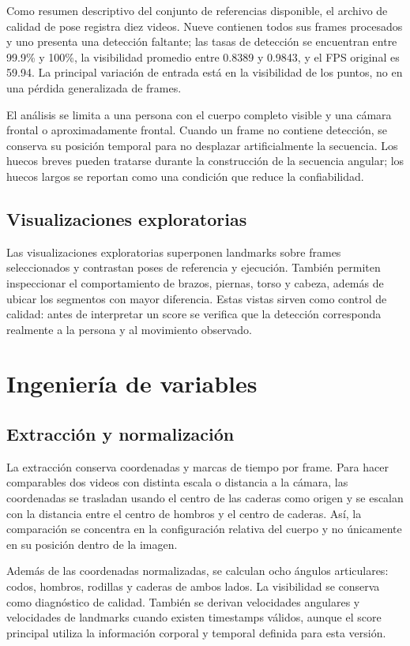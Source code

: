 \documentclass[12pt,a4paper]{article}
\begin{document}
Como resumen descriptivo del conjunto de referencias disponible, el archivo de calidad de pose registra diez videos. Nueve contienen todos sus frames procesados y uno presenta una detección faltante; las tasas de detección se encuentran entre 99.9\% y 100\%, la visibilidad promedio entre 0.8389 y 0.9843, y el FPS original es 59.94. La principal variación de entrada está en la visibilidad de los puntos, no en una pérdida generalizada de frames.

El análisis se limita a una persona con el cuerpo completo visible y una cámara frontal o aproximadamente frontal. Cuando un frame no contiene detección, se conserva su posición temporal para no desplazar artificialmente la secuencia. Los huecos breves pueden tratarse durante la construcción de la secuencia angular; los huecos largos se reportan como una condición que reduce la confiabilidad.
\subsection{Visualizaciones exploratorias}
Las visualizaciones exploratorias superponen landmarks sobre frames seleccionados y contrastan poses de referencia y ejecución. También permiten inspeccionar el comportamiento de brazos, piernas, torso y cabeza, además de ubicar los segmentos con mayor diferencia. Estas vistas sirven como control de calidad: antes de interpretar un score se verifica que la detección corresponda realmente a la persona y al movimiento observado.

\section{Ingeniería de variables}
\subsection{Extracción y normalización}
La extracción conserva coordenadas y marcas de tiempo por frame. Para hacer comparables dos videos con distinta escala o distancia a la cámara, las coordenadas se trasladan usando el centro de las caderas como origen y se escalan con la distancia entre el centro de hombros y el centro de caderas. Así, la comparación se concentra en la configuración relativa del cuerpo y no únicamente en su posición dentro de la imagen.

Además de las coordenadas normalizadas, se calculan ocho ángulos articulares: codos, hombros, rodillas y caderas de ambos lados. La visibilidad se conserva como diagnóstico de calidad. También se derivan velocidades angulares y velocidades de landmarks cuando existen timestamps válidos, aunque el score principal utiliza la información corporal y temporal definida para esta versión.
\end{document}
